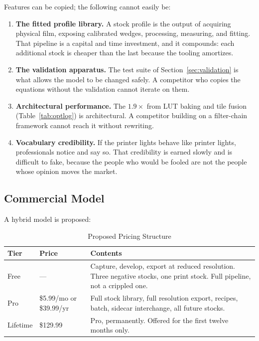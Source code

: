 Features can be copied; the following cannot easily be:

\begin{enumerate}
\item \textbf{The fitted profile library.} A stock profile is the output of
acquiring physical film, exposing calibrated wedges, processing, measuring, and
fitting. That pipeline is a capital and time investment, and it compounds: each
additional stock is cheaper than the last because the tooling amortizes.
\item \textbf{The validation apparatus.} The test suite of
Section~\ref{sec:validation} is what allows the model to be changed safely. A
competitor who copies the equations without the validation cannot iterate on
them.
\item \textbf{Architectural performance.} The $1.9\times$ from LUT baking and
tile fusion (Table~\ref{tab:optlog}) is architectural. A competitor building on
a filter-chain framework cannot reach it without rewriting.
\item \textbf{Vocabulary credibility.} If the printer lights behave like printer
lights, professionals notice and say so. That credibility is earned slowly and
is difficult to fake, because the people who would be fooled are not the people
whose opinion moves the market.
\end{enumerate}

\subsection{Commercial Model}

A hybrid model is proposed:

\begin{table}[htbp]
\caption{Proposed Pricing Structure}
\label{tab:pricing}
\begin{center}
\renewcommand{\arraystretch}{1.15}
\begin{tabularx}{\columnwidth}{@{}l l >{\raggedright\arraybackslash}X@{}}
\toprule
\textbf{Tier} & \textbf{Price} & \textbf{Contents} \\
\midrule
Free & --- & Capture, develop, export at reduced resolution. Three negative stocks, one print stock. Full pipeline, not a crippled one. \\
Pro & \$5.99/mo or \$39.99/yr & Full stock library, full resolution export, recipes, batch, sidecar interchange, all future stocks. \\
Lifetime & \$129.99 & Pro, permanently. Offered for the first twelve months only. \\
\bottomrule
\end{tabularx}
\end{center}
\end{table}

